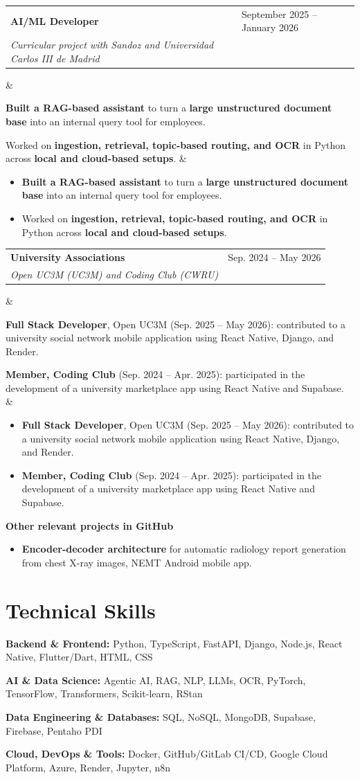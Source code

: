\documentclass[10pt,letterpaper]{article}
\makeatletter
\newcommand{\EntryGap}{0.26em}
\newcommand{\BulletGap}{0.12em}
\newcommand{\BulletTopGap}{0.14em}
\newcommand{\SkillsGap}{0.18em}
\newcommand{\LeftColumnWidth}{0.74\textwidth}
\newcommand{\RightColumnWidth}{0.23\textwidth}
\newcommand{\TitleInstitutionGap}{0.28em}
\newcommand{\cventry}[4]{
  \begin{tabularx}{\textwidth}{@{}p{\LeftColumnWidth}@{\hfill}p{\RightColumnWidth}@{}}
    {\bfseries\color{heading} #1} & {\RaggedLeft\small\color{lighttext} #2} \\[-\TitleInstitutionGap]
    {\itshape\color{textgray} #3} & \\
  \end{tabularx}
  \ifx&#4&%
  \else
    \vspace{\BulletTopGap}
    \begin{itemize}[itemsep=\BulletGap, topsep=0pt, parsep=0pt, partopsep=0pt]
      #4
    \end{itemize}
  \fi
  \vspace{\EntryGap}
}
\makeatother
\begin{document}
\cventry
  {AI/ML Developer}
  {September 2025 -- January 2026}
  {Curricular project with Sandoz and Universidad Carlos III de Madrid}
  {
    \item \textbf{Built a RAG-based assistant} to turn a \textbf{large unstructured document base} into an internal query tool for employees.
    \item Worked on \textbf{ingestion, retrieval, topic-based routing, and OCR} in Python across \textbf{local and cloud-based setups}.
  }

\cventry
  {University Associations}
  {Sep. 2024 -- May 2026}
  {Open UC3M (UC3M) and Coding Club (CWRU)}
  {
    \item \textbf{Full Stack Developer}, Open UC3M (Sep. 2025 -- May 2026): contributed to a university social network mobile application using React Native, Django, and Render.
    \item \textbf{Member, Coding Club} (Sep. 2024 -- Apr. 2025): participated in the development of a university marketplace app using React Native and Supabase.
  }

\vspace{0.6em}
\noindent \textbf{Other relevant projects in GitHub}
\vspace{0.4em}
\begin{itemize}[itemsep=\BulletGap, topsep=0pt, parsep=0pt, partopsep=0pt]
  \item \textbf{Encoder-decoder architecture} for automatic radiology report generation from chest X-ray images, NEMT Android mobile app.
\end{itemize}
  
\section{Technical Skills}
\vspace{0.3em}
\textbf{Backend \& Frontend:} Python, TypeScript, FastAPI, Django, Node.js, React Native, Flutter/Dart, HTML, CSS

\vspace{\SkillsGap}
\textbf{AI \& Data Science:} Agentic AI, RAG, NLP, LLMs, OCR, PyTorch, TensorFlow, Transformers, Scikit-learn, RStan

\vspace{\SkillsGap}
\textbf{Data Engineering \& Databases:} SQL, NoSQL, MongoDB, Supabase, Firebase, Pentaho PDI

\vspace{\SkillsGap}
\textbf{Cloud, DevOps \& Tools:} Docker, GitHub/GitLab CI/CD, Google Cloud Platform, Azure, Render, Jupyter, n8n
\end{document}
